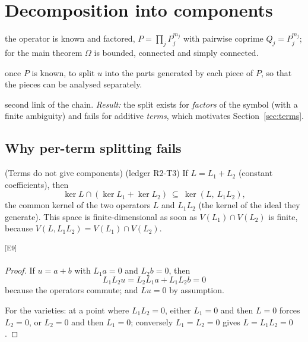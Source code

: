 \documentclass[11pt,a4paper]{article}
\theoremstyle{definition}
\newcommand{\led}[1]{\textcolor{cG}{\textsf{\footnotesize(ledger #1)}}}
\newcommand{\sectionbrief}[3]{\begin{leadin}\begin{description}[nosep,leftmargin=3.0cm,labelwidth=2.8cm]
  \item[Starting from] #1
  \item[Why this section] #2
  \item[Role in the paper] #3
  \end{description}\end{leadin}}
\newcommand{\edmark}[1]{\textsuperscript{\textcolor{cB}{\textsf{[#1]}}}}
\newcommand{\Var}{V}
\begin{document}
\section{Decomposition into components}\label{sec:fact}
\sectionbrief
{the operator is known and factored, $P=\prod_jP_j^{m_j}$ with pairwise coprime $Q_j=P_j^{m_j}$; for the main theorem $\Omega$ is bounded, connected and simply connected.}
{once $P$ is known, to split $u$ into the parts generated by each piece of $P$, so that the pieces can be analysed separately.}
{second link of the chain. \emph{Result:} the split exists for \emph{factors} of the symbol (with a finite ambiguity) and fails for additive \emph{terms}, which motivates Section~\ref{sec:terms}.}

\subsection{Why per-term splitting fails}
\begin{proposition}{(Terms do not give components) \led{R2-T3}}\label{prop:terms}
If $L=L_1+L_2$ (constant coefficients), then
\[
\ker L\cap(\ker L_1+\ker L_2)\ \subseteq\ \ker(L,\ L_1L_2),
\]
the common kernel of the two operators $L$ and $L_1L_2$ (the kernel of the ideal they generate). This space is finite-dimensional as soon as $\Var(L_1)\cap\Var(L_2)$ is finite, because $\Var(L,L_1L_2)=\Var(L_1)\cap\Var(L_2)$.
\end{proposition}
\edmark{E9}
\begin{proof}
If $u=a+b$ with $L_1a=0$ and $L_2b=0$, then
\[
L_1L_2u=L_2L_1a+L_1L_2b=0
\]
because the operators commute; and $Lu=0$ by assumption.

For the varieties: at a point where $L_1L_2=0$, either $L_1=0$ and then $L=0$ forces $L_2=0$, or $L_2=0$ and then $L_1=0$; conversely $L_1=L_2=0$ gives $L=L_1L_2=0$.
\end{proof}
\end{document}
